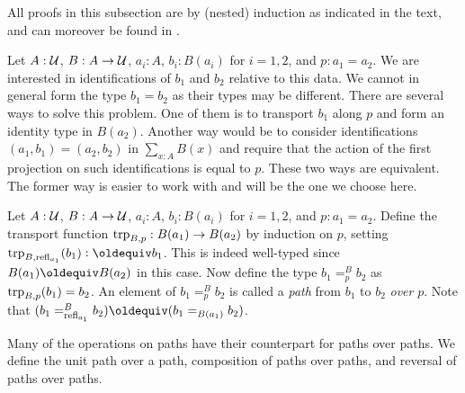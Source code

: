 \documentclass[a4paper,12pt]{amsart}
\begin{document}
All proofs in this subsection are by (nested) induction as indicated in the text,
and can moreover be found in \cite[\href{https://github.com/UniMath/UniMath/blob/master/UniMath/MoreFoundations/PathsOver.v}{PathsOver.v}]{UniMath}.

Let $A : \mathcal{U}$, $B : A \to \mathcal{U}$, $a_i:A$, $b_i:B(a_i)$ for $i=1,2$, and $p : a_1 = a_2$.
We are interested in identifications of $b_1$ and $b_2$ relative to this data.
We cannot in general form the type $b_1 = b_2$ as their types may be different.
There are several ways to solve this problem. One of them is to transport $b_1$ along
$p$ and form an identity type in $B(a_2)$. Another way would be to consider
identifications $(a_1,b_1) = (a_2,b_2)$ in $\sum_{x:A} B(x)$ and require that the
action of the first projection on such identifications is equal to $p$.
These two ways are equivalent.
The former way is easier to work with and will be the one we choose here.

\begin{definition}\label{def:pathover}
Let $A : \mathcal{U}$, $B : A \to \mathcal{U}$, $a_i:A$, $b_i:B(a_i)$ for $i=1,2$, and $p : a_1 = a_2$.
Define the transport function $\mathop{\mathrm{trp}_{B,p}} : B(a_1)\to B(a_2)$ by induction on $p$,
setting $\trp{B,\refl{a_1}}(b_1)\defeq b_1$. This is indeed well-typed since
$B(a_1)\jdeq B(a_2)$ in this case.
Now define the type $b_1 =^B_p b_2$ as $\mathop{\mathrm{trp}_{B,p}}(b_1) = b_2$.
An element of $b_1 =^B_p b_2$ is called
a \emph{path} from $b_1$ to $b_2$ \emph{over} $p$.
Note that $(b_1 =^B_{\refl{a_1}} b_2) \jdeq (b_1 =_{B(a_1)}  b_2)$.
\end{definition}

Many of the operations on paths have their counterpart for paths over paths.
We define the unit path over a path, composition of paths over paths, and reversal of paths over paths.
\end{document}
